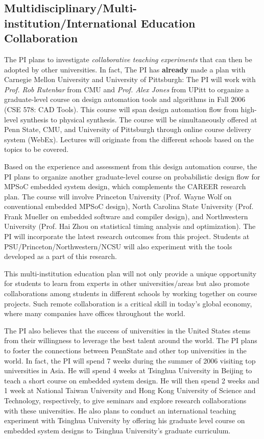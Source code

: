 \squishend

\vspace{10pt}
\subsection{
Multidisciplinary/Multi-institution/International Education
Collaboration}

 The PI plans to investigate {\it collaborative teaching experiments} that
can then be adopted by other universities. In fact, The PI has {\bf
already} made a plan with Carnegie Mellon University and University
of Pittsburgh: The PI will work with {\it Prof. Rob Rutenbar} from
CMU and {\it Prof. Alex Jones} from UPitt  to organize a
graduate-level course on design automation tools and algorithms in
Fall 2006 (CSE 578: CAD Tools). This course will span design
automation flow from high-level synthesis to physical synthesis. The
course will be simultaneously offered at Penn State, CMU, and
University of Pittsburgh through online course delivery system
(WebEx). Lectures will originate from the different schools based on
the topics to be covered.

Based on the experience and assessment from this design automation
course, the PI plans to organize another graduate-level course on
probabilistic design flow for MPSoC embedded system design, which
complements the CAREER research plan. The course will involve
Princeton University (Prof. Wayne Wolf on conventional embedded
MPSoC design), North Carolina State University (Prof. Frank
Mueller on embedded software and compiler design), and
Northwestern University (Prof. Hai Zhou on statistical timing
analysis and optimization). The PI will incorporate the latest
research outcomes from this project. Students at
PSU/Princeton/Northwestern/NCSU will also experiment with the
tools developed as a part of this research.

This multi-institution education plan will not only provide a
unique opportunity for students to learn from experts in other
universities/areas but also promote collaborations among students
in different schools by working together on course projects. Such
remote collaboration is a critical skill in today's global
economy, where many companies have offices throughout the world.

The PI also believes that the success of universities in the
United States stems from their willingness to leverage the best
talent around the world. The PI plans to foster the connections
between PennState and other top universities in the world. In
fact, the PI will spend 7 weeks during the summer of 2006 visiting
top universities in Asia. He will spend 4 weeks at Tsinghua
University in Beijing to teach a short course on embedded system
design. He will then spend 2 weeks and 1 week at National Taiwan
University and Hong Kong University of Science and Technology,
respectively, to give seminars and explore research collaborations
with these universities. He also plans to conduct an international
teaching experiment with Tsinghua University by offering his
graduate level course on embedded system designs to Tsinghua
University's graduate curriculum.

